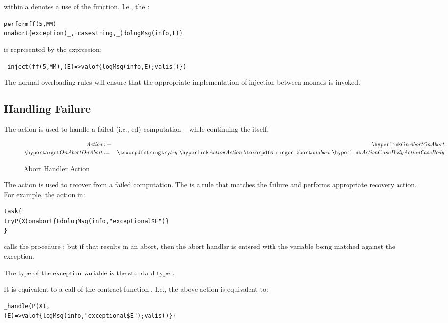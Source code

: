 \begin{aside}
 within a  denotes a use of the  function. I.e., the :
\begin{alltt}
perform ff(5,MM)
    on abort \{ exception(_,E case string,_) do logMsg(info,E) \}
\end{alltt}
is represented by the expression:
\begin{alltt}
\_inject(ff(5,MM), (E) => valof\{ logMsg(info,E); valis () \})
\end{alltt}
The normal overloading rules will ensure that the appropriate implementation of injection between monads is invoked.
\end{aside}

\subsection{Handling Failure}
\label{failAction}

The  action is used to handle a failed (i.e., ed) computation -- while continuing the  itself.

\begin{figure}[hbtp]
\begin{eqnarray*}
\emph{Action}&\arrowplus&\ntRef{OnAbort}\\
\ntDef{OnAbort}&\arrow&\q{try}\ \ntRef{Action}\ \q{on abort}\ \ntRef{ActionCaseBody}
\end{eqnarray*}
\caption{Abort Handler Action}
\label{failHandleFig}
\end{figure}

The  action is used to recover from a failed computation. The  is a rule that matches the failure and performs appropriate recovery action. For example, the action in:
\begin{alltt}
task\{
  try P(X) on abort \{ E do logMsg(info,"exceptional \$E") \}
\}
\end{alltt}
calls the procedure ; but if that results in an abort, then the abort handler is entered with the variable  being matched against the exception. 

The type of the exception variable is the standard type .

It is equivalent to a call of the contract function . I.e., the above action is equivalent to:
\begin{alltt}
\_handle(P(X),
         (E) => valof \{ logMsg(info,"exceptional \$E"); valis () \})
\end{alltt}

